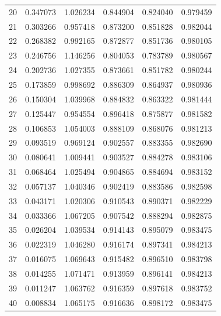 \begin{table}[ht]
{\begin{tabular}{c c c c c c}
20 & 0.347073 & 1.026234 & 0.844904 & 0.824040 & 0.979459 \\
21 & 0.303266 & 0.957418 & 0.873200 & 0.851828 & 0.982044 \\
22 & 0.268382 & 0.992165 & 0.872877 & 0.851736 & 0.980105 \\
23 & 0.246756 & 1.146256 & 0.804053 & 0.783789 & 0.980567 \\
24 & 0.202736 & 1.027355 & 0.873661 & 0.851782 & 0.980244 \\
25 & 0.173859 & 0.998692 & 0.886309 & 0.864937 & 0.980936 \\
26 & 0.150304 & 1.039968 & 0.884832 & 0.863322 & 0.981444 \\
27 & 0.125447 & 0.954554 & 0.896418 & 0.875877 & 0.981582 \\
28 & 0.106853 & 1.054003 & 0.888109 & 0.868076 & 0.981213 \\
29 & 0.093519 & 0.969124 & 0.902557 & 0.883355 & 0.982690 \\
30 & 0.080641 & 1.009441 & 0.903527 & 0.884278 & 0.983106 \\
31 & 0.068464 & 1.025494 & 0.904865 & 0.884694 & 0.983152 \\
32 & 0.057137 & 1.040346 & 0.902419 & 0.883586 & 0.982598 \\
33 & 0.043171 & 1.020306 & 0.910543 & 0.890371 & 0.982229 \\
34 & 0.033366 & 1.067205 & 0.907542 & 0.888294 & 0.982875 \\
35 & 0.026204 & 1.039534 & 0.914143 & 0.895079 & 0.983475 \\
36 & 0.022319 & 1.046280 & 0.916174 & 0.897341 & 0.984213 \\
37 & 0.016075 & 1.069643 & 0.915482 & 0.896510 & 0.983798 \\
38 & 0.014255 & 1.071471 & 0.913959 & 0.896141 & 0.984213 \\
39 & 0.011247 & 1.063762 & 0.916359 & 0.897618 & 0.983752 \\
40 & 0.008834 & 1.065175 & 0.916636 & 0.898172 & 0.983475 \\
\hline
\end{tabular}
}
\end{table}


